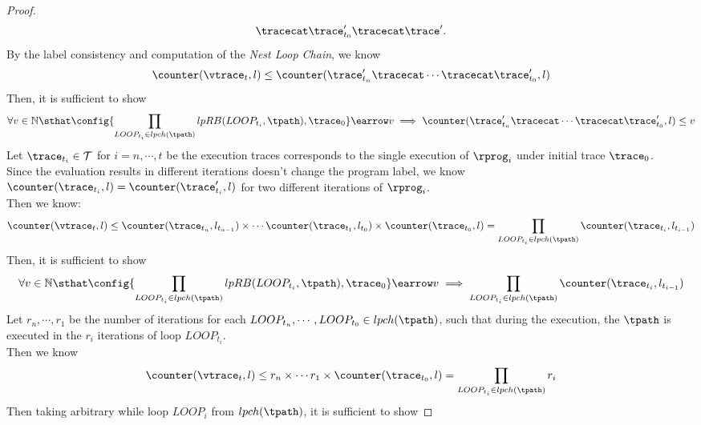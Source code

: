 \begin{proof}
\[\begin{array}{l}
{        \tracecat \trace_{t_0}' \tracecat \trace'}.
          \end{array}
        \]
        By the label consistency and computation of the 
        \emph{Nest Loop Chain}, we know
        \[
          \counter(\vtrace_t, l) \leq \counter(\trace_{t_n}' \tracecat \cdots 
          \tracecat \trace_{t_0}', l)
          \] 
        Then, it is sufficient to show 
        \[
          \forall v \in \mathbb{N} \sthat 
        \config{\prod_{LOOP_{t_i} \in lpch(\tpath)} lpRB(LOOP_{t_i}, \tpath), \trace_0
        } \earrow v 
        \implies  \counter(\trace_{t_n}' \tracecat \cdots 
        \tracecat \trace_{t_0}', l) \leq v
      \]
%
Let $\trace_{t_i} \in \mathcal{T}$ for $i = n, \cdots, t$ 
be the execution traces corresponds to the single execution of $\rprog_i$ under initial trace $\trace_0$.
\\
Since the evaluation results in different iterations doesn't change the program label,
we know $\counter(\trace_{t_i}, l) = \counter(\trace_{t_i}', l)$ for two different iterations of $\rprog_i$.
\\
Then we know:
\[
  \counter(\vtrace_t, l) \leq 
  \counter(\trace_{t_n}, l_{t_{n-1}}) \times \cdots 
  \counter(\trace_{t_1}, l_{t_{0}}) \times \counter(\trace_{t_0}, l)
  = \prod\limits_{LOOP_{t_i} \in lpch(\tpath)} \counter(\trace_{t_i}, l_{t_{i-1}})
  \]
%
Then, it is sufficient to show 
\[
  \forall v \in \mathbb{N} \sthat 
\config{\prod_{LOOP_{t_i} \in lpch(\tpath)} lpRB(LOOP_{t_i}, \tpath), \trace_0
} \earrow v 
\implies  
\prod\limits_{LOOP_{t_i} \in lpch(\tpath)} \counter(\trace_{t_i}, l_{t_{i-1}})
\]
%
Let $r_n, \cdots, r_1$ be the number of iterations for each $LOOP_{t_n}, \cdots, LOOP_{t_0} \in lpch(\tpath)$, 
such that
during the execution,
the $\tpath$ is executed in the $r_i$ iterations of loop $LOOP_{t_i}$.
\\
Then we know
\[
  \counter(\vtrace_t, l) \leq 
  r_n \times \cdots 
  r_1 \times \counter(\trace_{t_0}, l)
  = 
  \prod\limits_{LOOP_{t_i} \in lpch(\tpath)} r_i
  \]
%
Then taking arbitrary while loop $LOOP_i$ from $lpch(\tpath)$, it is sufficient to show

\end{proof}
